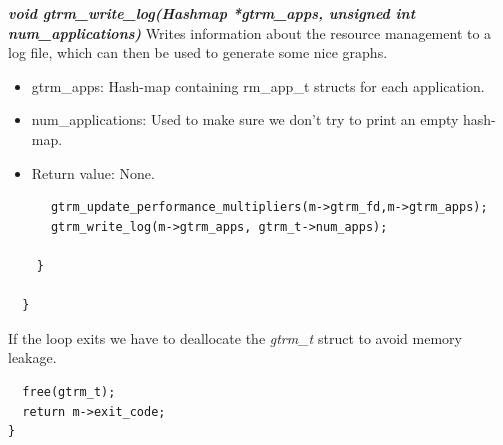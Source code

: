 \documentclass[nobiblatex]{LTHthesis}
\begin{document}
\begin{framed}
		\begin{flushleft}
				\textbf{\emph{{void gtrm\_write\_log(Hashmap *gtrm\_apps, unsigned int num\_applications)}}} \newline
				Writes information about the resource management to a log file, which can then be used to generate some nice graphs.
				\begin{itemize} 
				\item gtrm\_apps: Hash-map containing rm\_app\_t structs for each application.
				\item num\_applications: Used to make sure we don't try to print an empty hash-map.
				\item Return value: None.
		\end{itemize}

		\end{flushleft}	
\end{framed}




\begin{verbatim}
      gtrm_update_performance_multipliers(m->gtrm_fd,m->gtrm_apps);
      gtrm_write_log(m->gtrm_apps, gtrm_t->num_apps);

    }

  }
\end{verbatim}
If the loop exits we have to deallocate the \emph{gtrm\_t} struct to avoid memory leakage.
\begin{verbatim}
  free(gtrm_t);
  return m->exit_code;
}
\end{verbatim}
\end{document}
